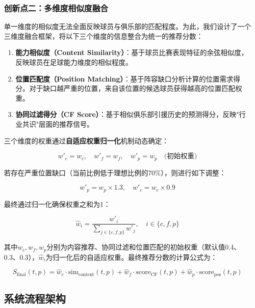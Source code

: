 \documentclass[a4paper]{article}
\begin{document}
\subsubsection{创新点二：多维度相似度融合}

单一维度的相似度无法全面反映球员与俱乐部的匹配程度。为此，我们设计了一个三维度融合框架，将以下三个维度的信息整合为统一的推荐分数：

\begin{enumerate}
    \item \textbf{能力相似度（Content Similarity）}：基于球员比赛表现特征的余弦相似度，反映球员在足球能力维度的相似程度。
    \item \textbf{位置匹配度（Position Matching）}：基于阵容缺口分析计算的位置需求得分。对于缺口越严重的位置，来自该位置的候选球员获得越高的位置匹配权重。
    \item \textbf{协同过滤得分（CF Score）}：基于相似俱乐部引援历史的预测得分，反映"行业共识"层面的推荐信号。
\end{enumerate}

三个维度的权重通过\textbf{自适应权重归一化}机制动态确定：

\begin{equation}
    w'_c = w_c,\quad w'_f = w_f,\quad w'_p = w_p \quad \text{(初始权重)}
\end{equation}

若存在严重位置缺口（当前比例低于理想比例的70\%），则进行如下调整：

\begin{equation}
    w'_p = w_p \times 1.3,\quad w'_c = w_c \times 0.9
\end{equation}

最终通过归一化确保权重之和为1：

\begin{equation}
    \hat{w}_i = \frac{w'_i}{\sum_{j \in \{c,f,p\}} w'_j},\quad i \in \{c, f, p\}
\end{equation}

其中\(w_c, w_f, w_p\)分别为内容推荐、协同过滤和位置匹配的初始权重（默认值0.4、0.3、0.3），\(\hat{w}_i\)为归一化后的自适应权重。最终推荐分数的计算公式为：

\begin{equation}
    S_{\text{final}}(t, p) = \hat{w}_c \cdot \text{sim}_{\text{content}}(t, p) + \hat{w}_f \cdot \text{score}_{\text{CF}}(t, p) + \hat{w}_p \cdot \text{score}_{\text{pos}}(t, p)
\end{equation}

\subsection{系统流程架构}
\end{document}
